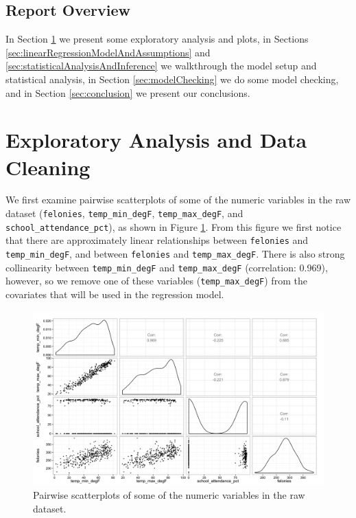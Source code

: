 \documentclass[11pt,notitlepage]{article}
\begin{document}
\subsection{Report Overview}

In Section \ref{sec:eda} we present some exploratory analysis and plots, in Sections \ref{sec:linearRegressionModelAndAssumptions} and \ref{sec:statisticalAnalysisAndInference} we walkthrough the model setup and statistical analysis, in Section \ref{sec:modelChecking} we do some model checking, and in Section \ref{sec:conclusion} we present our conclusions. 



\section{Exploratory Analysis and Data Cleaning}
\label{sec:eda}

We first examine pairwise scatterplots of some of the numeric variables in the raw dataset (\texttt{felonies}, \texttt{temp_min_degF}, \texttt{temp_max_degF}, and \texttt{school_attendance_pct}), as shown in Figure \ref{fig:pairsNumericExclAcc}. From this figure we first notice that there are approximately linear relationships between \texttt{felonies} and \texttt{temp_min_degF}, and between \texttt{felonies} and \texttt{temp_max_degF}. There is also strong collinearity between \texttt{temp_min_degF} and \texttt{temp_max_degF} (correlation: 0.969), however, so we remove one of these variables (\texttt{temp_max_degF}) from the covariates that will be used in the regression model.

\begin{figure}[!h]
	\centering
	\captionsetup{width=0.9\textwidth}
	\includegraphics[width=6in]{figures/pairsNumericExclAcc.png}
	\caption{Pairwise scatterplots of some of the numeric variables in the raw dataset.}
	\label{fig:pairsNumericExclAcc}
\end{figure}
\end{document}
